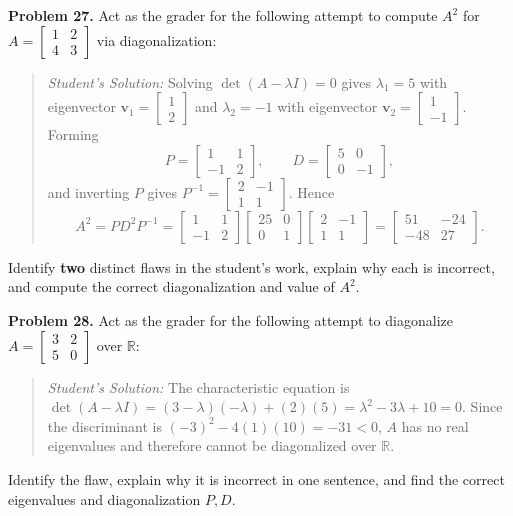 \documentclass[11pt, letterpaper]{article}
\theoremstyle{definition}
\theoremstyle{remark}
\begin{document}
\textbf{Problem 27.}\label{prob:27}
Act as the grader for the following attempt to compute $A^{2}$ for $A = \begin{bmatrix} 1 & 2 \\ 4 & 3 \end{bmatrix}$ via diagonalization:
\begin{quote}
\emph{Student's Solution:} Solving $\det(A - \lambda I) = 0$ gives $\lambda_{1} = 5$ with eigenvector $\mathbf{v}_{1} = \begin{bmatrix} 1 \\ 2 \end{bmatrix}$ and $\lambda_{2} = -1$ with eigenvector $\mathbf{v}_{2} = \begin{bmatrix} 1 \\ -1 \end{bmatrix}$. Forming
\[
P = \begin{bmatrix} 1 & 1 \\ -1 & 2 \end{bmatrix}, \qquad D = \begin{bmatrix} 5 & 0 \\ 0 & -1 \end{bmatrix},
\]
and inverting $P$ gives $P^{-1} = \begin{bmatrix} 2 & -1 \\ 1 & 1 \end{bmatrix}$. Hence
\[
A^{2} = PD^{2}P^{-1} = \begin{bmatrix} 1 & 1 \\ -1 & 2 \end{bmatrix} \begin{bmatrix} 25 & 0 \\ 0 & 1 \end{bmatrix} \begin{bmatrix} 2 & -1 \\ 1 & 1 \end{bmatrix} = \begin{bmatrix} 51 & -24 \\ -48 & 27 \end{bmatrix}.
\]
\end{quote}
Identify \textbf{two} distinct flaws in the student's work, explain why each is incorrect, and compute the correct diagonalization and value of $A^{2}$.

\textbf{Problem 28.}\label{prob:28}
Act as the grader for the following attempt to diagonalize $A = \begin{bmatrix} 3 & 2 \\ 5 & 0 \end{bmatrix}$ over $\mathbb{R}$:
\begin{quote}
\emph{Student's Solution:} The characteristic equation is $\det(A - \lambda I) = (3 - \lambda)(-\lambda) + (2)(5) = \lambda^{2} - 3\lambda + 10 = 0$. Since the discriminant is $(-3)^{2} - 4(1)(10) = -31 < 0$, $A$ has no real eigenvalues and therefore cannot be diagonalized over $\mathbb{R}$.
\end{quote}
Identify the flaw, explain why it is incorrect in one sentence, and find the correct eigenvalues and diagonalization $P, D$.
\end{document}
